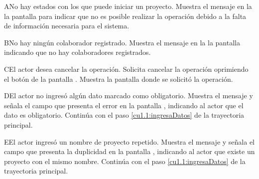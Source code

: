  \begin{UCtrayectoriaA}{A}{No hay estados con los que puede iniciar un proyecto.}
    \UCpaso[\UCsist] Muestra el mensaje  en la la pantalla  para indicar que no es posible realizar la operación debido a la falta de información necesaria para el sistema.
 \end{UCtrayectoriaA} 
 \begin{UCtrayectoriaA}{B}{No hay ningún colaborador registrado.}
    \UCpaso[\UCsist] Muestra el mensaje  en la la pantalla  indicando que no hay colaboradores registrados.
 \end{UCtrayectoriaA} 
 \begin{UCtrayectoriaA}{C}{El actor desea cancelar la operación.}
    \UCpaso[\UCactor] Solicita cancelar la operación oprimiendo el botón  de la pantalla .
    \UCpaso[\UCsist] Muestra la pantalla donde se solicitó la operación.
 \end{UCtrayectoriaA} 
 \begin{UCtrayectoriaA}{D}{El actor no ingresó algún dato marcado como obligatorio.}
    \UCpaso[\UCsist] Muestra el mensaje  y señala el campo que presenta el error en la pantalla 
	    , indicando al actor que el dato es obligatorio.
    \UCpaso[] Continúa con el paso \ref{cu1.1:ingresaDatos} de la trayectoria principal.
 \end{UCtrayectoriaA}
 \begin{UCtrayectoriaA}{E}{El actor ingresó un nombre de proyecto repetido.}
    \UCpaso[\UCsist] Muestra el mensaje  y señala el campo que presenta la duplicidad en la pantalla 
	    , indicando al actor que existe un proyecto con el mismo nombre.
    \UCpaso[] Continúa con el paso \ref{cu1.1:ingresaDatos} de la trayectoria principal.
 \end{UCtrayectoriaA}
